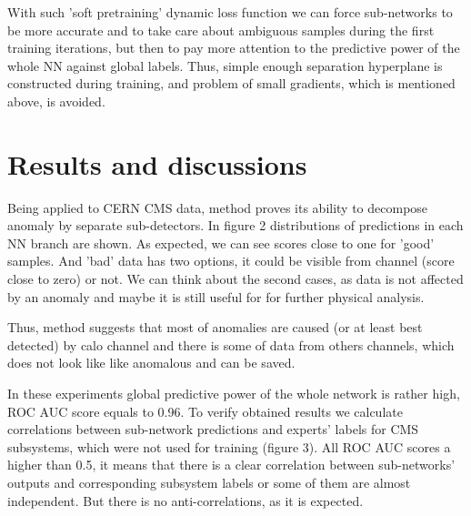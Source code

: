\documentclass[a4paper]{jpconf}
\begin{document}
With such 'soft pretraining' dynamic loss function we can force sub-networks to be more accurate and to take care about ambiguous samples during the first training iterations, but then to pay more attention to the predictive power of the whole NN against global labels. Thus, simple enough separation hyperplane is constructed during training, and problem of small gradients, which is mentioned above, is avoided.

\section{Results and discussions}
Being applied to CERN CMS data, method proves its ability to decompose anomaly by separate sub-detectors. In figure 2 distributions of predictions in each NN branch are shown. As expected, we can see scores close to one for 'good' samples. And 'bad' data has two options, it could be visible from channel (score close to zero) or not. We can think about the second cases, as data is not affected by an anomaly and maybe it is still useful for for further physical analysis.

Thus, method suggests that most of anomalies are caused (or at least best detected) by calo channel and there is some of data from others channels, which does not look like like anomalous and can be saved.

In these experiments global predictive power of the whole network is rather high, ROC AUC score equals to 0.96.
To verify obtained results we calculate correlations between sub-network predictions and experts' labels for CMS subsystems, which were not used for training (figure 3). All ROC AUC scores a higher than 0.5, it means that there is a clear correlation between sub-networks’ outputs and corresponding subsystem labels or some of them are almost independent. But there is no anti-correlations, as it is expected.
\end{document}
